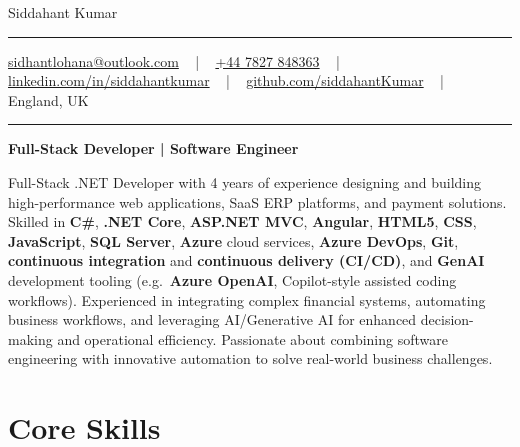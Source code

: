 \documentclass[letterpaper,10pt]{article}
\newcommand{\documentTitle}[2]{
  \begin{center}
    \vspace*{-0.3in}
    {\Huge\color{accentTitle} #1}
    \vspace{8pt}
    {\color{accentLine} \hrule}
    \vspace{2pt}
    \footnotesize{#2}
    \vspace{2pt}
    {\color{accentLine} \hrule}
  \end{center}
}
\begin{document}
\documentTitle{Siddahant Kumar}{
\vspace{0.1cm}
\href{mailto:sidhantlohana@outlook.com}{sidhantlohana@outlook.com} ~ | ~
\href{tel:+447827848363}{+44 7827 848363} ~ | ~
\href{https://www.linkedin.com/in/siddahantkumar/}{linkedin.com/in/siddahantkumar} ~ | ~
\href{https://github.com/siddahantKumar}{github.com/siddahantKumar} ~ | ~
England, UK
}

\begin{center}
\textbf{Full-Stack Developer | Software Engineer}
\end{center}

Full-Stack .NET Developer with 4 years of experience designing and building high-performance web applications, SaaS ERP platforms, and payment solutions. Skilled in \textbf{C\#}, \textbf{.NET Core}, \textbf{ASP.NET MVC}, \textbf{Angular}, \textbf{HTML5}, \textbf{CSS}, \textbf{JavaScript}, \textbf{SQL Server}, \textbf{Azure} cloud services, \textbf{Azure DevOps}, \textbf{Git}, \textbf{continuous integration} and \textbf{continuous delivery (CI/CD)}, and \textbf{GenAI} development tooling (e.g.\ \textbf{Azure OpenAI}, Copilot-style assisted coding workflows). Experienced in integrating complex financial systems, automating business workflows, and leveraging AI/Generative AI for enhanced decision-making and operational efficiency. Passionate about combining software engineering with innovative automation to solve real-world business challenges.


\section{Core Skills}
\end{document}
